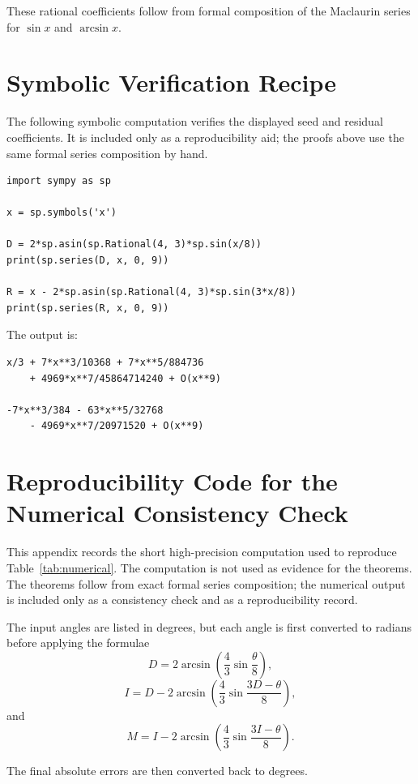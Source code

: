 \documentclass[11pt]{article}
\theoremstyle{remark}
\begin{document}
These rational coefficients follow from formal composition of the Maclaurin series for
$\sin x$ and $\arcsin x$.

\section{Symbolic Verification Recipe}
\label{app:symbolic-verification}

The following symbolic computation verifies the displayed seed and residual
coefficients.  It is included only as a reproducibility aid; the proofs above use
the same formal series composition by hand.

\begin{verbatim}
import sympy as sp

x = sp.symbols('x')

D = 2*sp.asin(sp.Rational(4, 3)*sp.sin(x/8))
print(sp.series(D, x, 0, 9))

R = x - 2*sp.asin(sp.Rational(4, 3)*sp.sin(3*x/8))
print(sp.series(R, x, 0, 9))
\end{verbatim}

The output is:

\begin{verbatim}
x/3 + 7*x**3/10368 + 7*x**5/884736
    + 4969*x**7/45864714240 + O(x**9)

-7*x**3/384 - 63*x**5/32768
    - 4969*x**7/20971520 + O(x**9)
\end{verbatim}

\section{Reproducibility Code for the Numerical Consistency Check}
\label{app:numerical-code}

This appendix records the short high-precision computation used to reproduce
Table~\ref{tab:numerical}.  The computation is not used as evidence for the
theorems.  The theorems follow from exact formal series composition; the
numerical output is included only as a consistency check and as a reproducibility
record.

The input angles are listed in degrees, but each angle is first converted to
radians before applying the formulae
\[
D
=
2\arcsin\!\left(
\frac43\sin\frac{\theta}{8}
\right),
\]
\[
I
=
D
-
2\arcsin\!\left(
\frac43\sin\frac{3D-\theta}{8}
\right),
\]
and
\[
M
=
I
-
2\arcsin\!\left(
\frac43\sin\frac{3I-\theta}{8}
\right).
\]

\newpage
The final absolute errors are then converted back to degrees.
\end{document}
